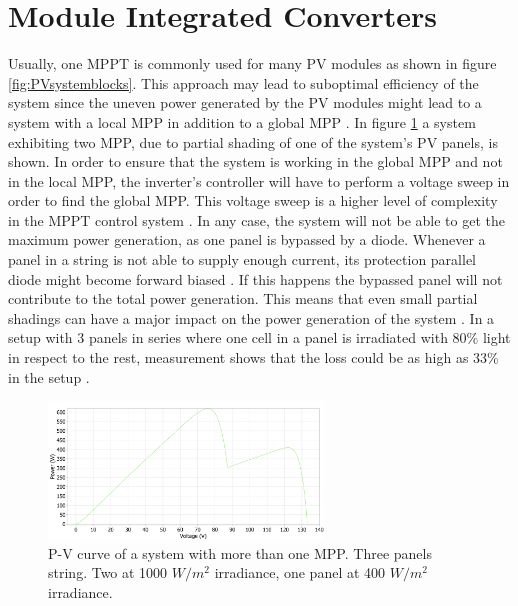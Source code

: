
\section{Module Integrated Converters}

Usually, one MPPT is commonly used for many PV modules as shown in figure \ref{fig:PVsystemblocks}. This approach may lead to suboptimal efficiency of the system since the uneven power generated by the PV modules might lead to a system with a local MPP in addition to a global MPP \cite{AN1521_MC}. In figure \ref{multiple_local_MPP} a system exhibiting two MPP, due to partial shading of one of the system's PV panels, is shown. In order to ensure that the system is working in the global MPP and not in the local MPP, the inverter's controller will have to perform a voltage sweep in order to find the global MPP. This voltage sweep is a higher level of complexity in the MPPT control system \cite{AN1521_MC}. In any case, the system will not be able to get the maximum power generation, as one panel is bypassed by a diode. Whenever a panel in a string is not able to supply enough current, its protection parallel diode might become  forward biased \cite{ArchitectureMIC}. If this happens the bypassed panel will not contribute to the total power generation. This means that even small partial shadings can have a major impact on the power generation of the system \cite{partial_shading_cons}. In a setup with 3 panels in series where one cell in a panel is irradiated with 80\% light in respect to the rest, measurement shows that the loss could be as high as 33\% in the setup \cite{partial_shading_effect}.

\begin{figure}[H]
	\begin{center}
		\includegraphics[width=0.65\textwidth]{../Pictures/local_MPP_PLECS.png}
		\caption{P-V curve of a system with more than one MPP. Three panels string. Two at 1000 $W/m^2$ irradiance, one panel at 400 $W/m^2$ irradiance.}
		\label{multiple_local_MPP}
	\end{center}	
\end{figure} 

